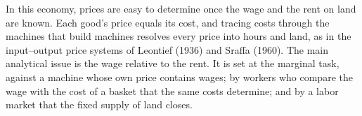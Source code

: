 \documentclass[12pt]{article}
\theoremstyle{plain}
\theoremstyle{definition}
\theoremstyle{remark}
\begin{document}
In this economy, prices are easy to determine once the wage and the rent on land are known. Each
good's price equals its cost, and tracing costs through the machines that build machines resolves
every price into hours and land, as in the input--output price systems of Leontief (1936) and
Sraffa (1960). The main analytical issue is the wage relative to the rent. It is
set at the marginal task, against a machine whose own price contains wages; by workers who compare
the wage with the cost of a basket that the same costs determine; and by a labor market that the
fixed supply of land closes.

\end{document}
